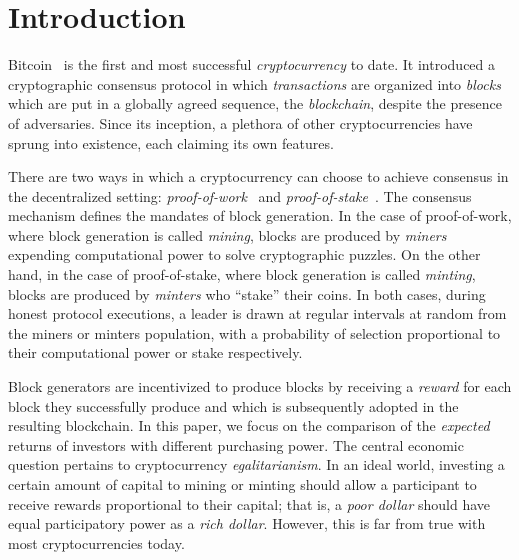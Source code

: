 
\section{Introduction}

Bitcoin~\cite{bitcoin} is the first and most successful \emph{cryptocurrency} to
date. It introduced a cryptographic consensus protocol in
which \emph{transactions} are organized into \emph{blocks} which are put in a
globally agreed sequence, the \emph{blockchain}, despite the presence of adversaries. Since its
inception, a plethora of other cryptocurrencies have sprung into existence, each
claiming its own features.

There are two ways in which a cryptocurrency can choose to achieve consensus in
the decentralized setting:
\emph{proof-of-work}~\cite{C:DwoNao92} and
\emph{proof-of-stake}~\cite{C:KRDO17}. The consensus mechanism defines the
mandates of block generation. In the case of proof-of-work, where block
generation is called \emph{mining}, blocks are produced by \emph{miners}
expending computational power to solve cryptographic puzzles. On the other hand,
in the case of proof-of-stake, where block generation is called \emph{minting},
blocks are produced by \emph{minters} who ``stake'' their coins. In both cases,
during honest protocol executions, a leader is drawn at regular intervals at random from the
miners or minters population, with a probability of selection proportional to
their computational power or stake respectively.

Block generators are
incentivized to produce blocks by receiving a \emph{reward} for each block they
successfully produce and which is subsequently adopted in the resulting
blockchain.
In this paper, we focus on the
comparison of the \emph{expected} returns of investors with different purchasing
power. The central economic question pertains to cryptocurrency \emph{egalitarianism}.
In an ideal world, investing a certain amount of capital to mining or minting
should allow a participant to receive rewards proportional to their capital;
that is, a \emph{poor dollar} should have equal participatory power as a \emph{rich dollar}.
However, this is far from true with most cryptocurrencies today.

